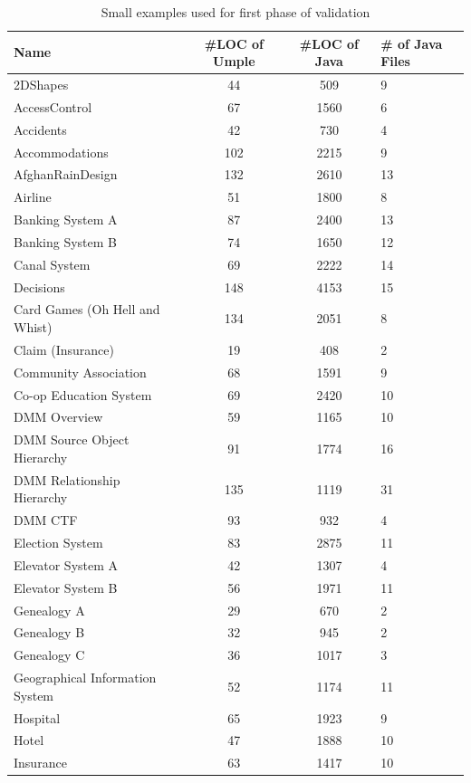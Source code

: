 \begin{table}
\caption{Small examples used for first phase of validation}
\label{table:umpleexamples}
\begin{tabularx}{\textwidth}{l|SSX}
\toprule
{}
\textbf{Name} & \textbf{\#LOC of Umple} & \textbf{\#LOC of Java} & \textbf{\# of Java Files} \\ \hline
2DShapes & 44 & 509 & 9\\ \hline
AccessControl & 67 & 1560 & 6\\ \hline
Accidents & 42 & 730 & 4\\ \hline
Accommodations & 102 & 2215 & 9\\ \hline
AfghanRainDesign & 132 & 2610 & 13\\ \hline
Airline & 51 & 1800 & 8\\ \hline
Banking System A & 87 & 2400 & 13\\ \hline
Banking System B & 74 & 1650 & 12\\ \hline
Canal System & 69 & 2222 & 14\\ \hline
Decisions & 148 & 4153 & 15\\ \hline
Card Games (Oh Hell and Whist) & 134 & 2051 & 8\\ \hline
Claim (Insurance) & 19 & 408 & 2\\ \hline
Community Association & 68 & 1591 & 9\\ \hline
Co-op Education System & 69 & 2420 & 10\\ \hline
DMM Overview & 59 & 1165 & 10\\ \hline
DMM Source Object Hierarchy & 91 & 1774 & 16\\ \hline
DMM Relationship Hierarchy & 135 & 1119 & 31\\ \hline
DMM CTF & 93 & 932 & 4\\ \hline
Election System & 83 & 2875 & 11\\ \hline
Elevator System A & 42 & 1307 & 4\\ \hline
Elevator System B & 56 & 1971 &11\\ \hline
Genealogy A & 29 & 670 & 2\\ \hline
Genealogy B & 32 & 945 & 2\\ \hline
Genealogy C & 36 & 1017 & 3\\ \hline
Geographical Information System & 52 & 1174 & 11\\ \hline
Hospital & 65 & 1923 & 9\\ \hline
Hotel & 47 & 1888 & 10\\ \hline
Insurance & 63 & 1417 & 10\\ \hline

\end{tabularx}
\end{table}
